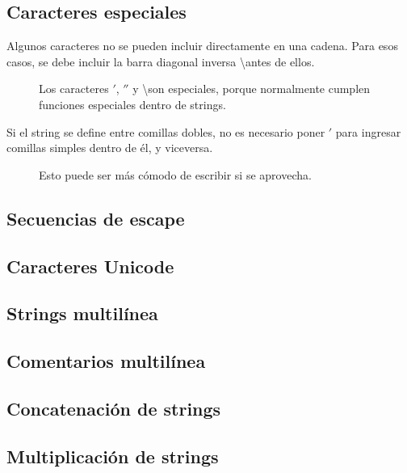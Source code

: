 \documentclass{article}
\begin{document}
\subsection{Caracteres especiales}

Algunos caracteres no se pueden incluir directamente en una cadena. Para esos casos, se debe incluir la barra diagonal inversa \textbackslash antes de ellos.

\begin{figure*}[ht!]
  \caption{Los caracteres $'$, $''$ y \textbackslash son especiales, porque normalmente cumplen funciones especiales dentro de strings.}
\end{figure*}

Si el string se define entre comillas dobles, no es necesario poner $'$ para ingresar comillas simples dentro de él, y viceversa.

\begin{figure*}[ht!]
  \caption{Esto puede ser más cómodo de escribir si se aprovecha.}
\end{figure*}

\subsection{Secuencias de escape}

\subsection{Caracteres Unicode}

\subsection{Strings multilínea}

\subsection{Comentarios multilínea}

\subsection{Concatenación de strings}

\subsection{Multiplicación de strings}
\end{document}
